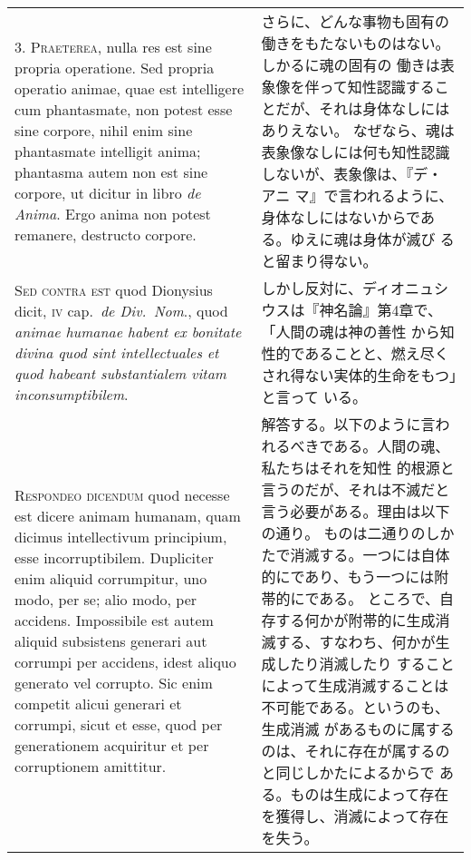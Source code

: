 \documentclass[10pt]{jsarticle} %
\begin{document}
\begin{longtable}{p{21em}p{21em}}
\\



3. {\scshape Praeterea}, nulla res est sine propria operatione. Sed propria operatio
animae, quae est intelligere cum phantasmate, non potest esse sine
corpore, nihil enim sine phantasmate intelligit anima; phantasma autem
non est sine corpore, ut dicitur in libro {\itshape de Anima}. Ergo anima non
potest remanere, destructo corpore.


&

さらに、どんな事物も固有の働きをもたないものはない。しかるに魂の固有の
働きは表象像を伴って知性認識することだが、それは身体なしにはありえない。
なぜなら、魂は表象像なしには何も知性認識しないが、表象像は、『デ・アニ
マ』で言われるように、身体なしにはないからである。ゆえに魂は身体が滅び
ると留まり得ない。


\\



{\scshape Sed contra est} quod Dionysius dicit, {\scshape iv} cap.~{\itshape de Div.~Nom}., quod {\itshape animae
humanae habent ex bonitate divina quod sint {\itshape intellectuales} et quod
habeant {\itshape substantialem vitam inconsumptibilem}}.


&

しかし反対に、ディオニュシウスは『神名論』第4章で、「人間の魂は神の善性
 から知性的であることと、燃え尽くされ得ない実体的生命をもつ」と言って
 いる。

\\



{\scshape Respondeo dicendum} quod necesse est dicere animam humanam, quam
dicimus intellectivum principium, esse incorruptibilem. Dupliciter
enim aliquid corrumpitur, uno modo, per se; alio modo, per
accidens. Impossibile est autem aliquid subsistens generari aut
corrumpi per accidens, idest aliquo generato vel corrupto. Sic enim
competit alicui generari et corrumpi, sicut et esse, quod per
generationem acquiritur et per corruptionem amittitur. 


&

解答する。以下のように言われるべきである。人間の魂、私たちはそれを知性
的根源と言うのだが、それは不滅だと言う必要がある。理由は以下の通り。
ものは二通りのしかたで消滅する。一つには自体的にであり、もう一つには附
 帯的にである。
ところで、自存する何かが附帯的に生成消滅する、すなわち、何かが生成したり消滅したり
 することによって生成消滅することは不可能である。というのも、生成消滅
 があるものに属するのは、それに存在が属するのと同じしかたによるからで
 ある。ものは生成によって存在を獲得し、消滅によって存在を失う。



\end{longtable}
\end{document}
